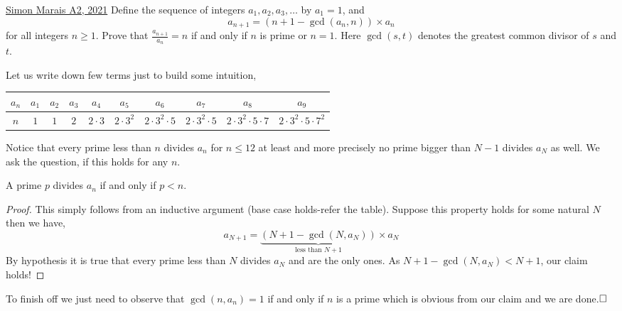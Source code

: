 \begin{problem}{3}{\href{https://artofproblemsolving.com/community/c7h2709003p34748857}{Simon Marais A2, 2021}}
	Define the sequence of integers $a_1, a_2, a_3, \ldots$ by $a_1 = 1$, and
\[ a_{n+1} = \left(n+1-\gcd(a_n,n) \right) \times a_n \]for all integers $n \ge 1$. Prove that $\frac{a_{n+1}}{a_n}=n$ if and only if $n$ is prime or $n=1$. Here $\gcd(s,t)$ denotes the greatest common divisor of $s$ and $t$.
	\begin{solution}Let us write down few terms just to build some intuition,
	\begin{center}\begin{tabular}{c|c c c c c c c c c}
$a_n$ & $a_1$ & $a_2$ & $a_3$ & $a_4$ & $a_5$ & $a_6$ & $a_7$ & $a_8$ & $a_9$\\
\hline
$n$ & $1$ & $1$ & $2$ & $2\cdot 3$ & $2\cdot 3^2$ & $2\cdot 3^2\cdot 5$ & $2\cdot 3^2\cdot 5$ &$2\cdot 3^2\cdot 5\cdot 7$ & $2\cdot 3^2\cdot 5\cdot 7^2$\\
	\end{tabular}\end{center}
	\indent Notice that every prime less than $n$ divides $a_n$ for $n\le 12$ at least and more precisely no prime bigger than $N-1$ divides $a_N$ as well. We ask the question, if this holds for any $n$.

	\begin{numclaim}{1}
		A prime $p$ divides $a_n$ if and only if $p<n$.
	\end{numclaim}
	\begin{proof} This simply follows from an inductive argument (base case holds-refer the table). Suppose this property holds for some natural $N$ then we have,
$$a_{N+1}=\underbrace{(N+1-\gcd(N, a_N))}_{\text{less than $N+1$}}\times a_N $$By hypothesis it is true that every prime less than $N$ divides $a_N$ and are the only ones. As $N+1-\gcd(N, a_N)< N+1$, our claim holds!
	\end{proof}
	\noindent To finish off we just need to observe that $\gcd(n, a_n)=1$ if and only if $n$ is a prime which is obvious from our claim and we are done.$\qedwhite$
	\end{solution}
\end{problem}

